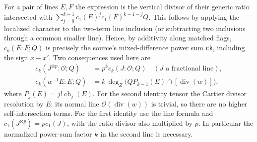 For a pair of lines \(E,F\) the expression is the vertical
divisor of their generic ratio intersected with
\(\sum_{j=0}^{k-1}c_1(E)^jc_1(F)^{k-1-j}Q\).
This follows by applying the localized character to the
two-term line inclusion (or subtracting two inclusions
through a common smaller line). Hence, by additivity along
matched flags, \(c_k(E:F;Q)\) is precisely the source's
mixed-difference power sum \texttt{ck}, including the sign
\(x-x'\). Two consequences used here are
\[
\begin{split}
 c_k(J^{\otimes p}:\mathcal O;Q)
   &=p^k c_k(J:\mathcal O;Q) \quad(J\text{ a fractional line}),\\
 c_k(w^{-1}E:E;Q)
   &= k\,\deg_Z\bigl(Q P_{k-1}(E)\cap[\operatorname{div}(w)]\bigr),
                                                               \tag{RC3}
\end{split}
\]
where \(P_j(E)=j!\operatorname{ch}_j(E)\).
For the second identity tensor the Cartier divisor resolution
by \(E\): its normal line \(\mathcal O(\operatorname{div}(w))\)
is trivial, so there are no higher self-intersection terms.
For the first identity use the line formula and
\(c_1(J^{\otimes p})=p c_1(J)\), with the ratio divisor
also multiplied by \(p\). In particular the normalized
power-sum factor \(k\) in the second line is necessary.

